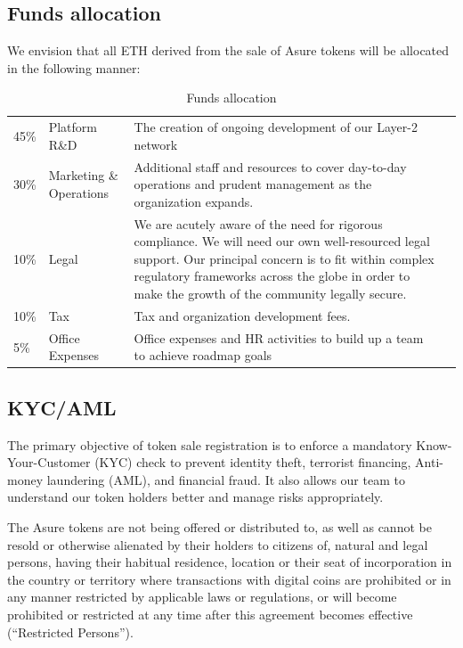 \subsection{Funds allocation}

We envision that all ETH derived from the sale of Asure tokens will be allocated in the following manner:
\newline\newline

\begin{table}[H]
\begin{tabular}{llp{}l}
  45\% & Platform R\&D & The creation of ongoing development of our Layer-2 network \\
  30\% & Marketing \& Operations & Additional staff and resources to cover day-to-day operations and prudent management as the organization expands. \\
  10\% & Legal & We are acutely aware of the need for rigorous compliance. We will need our own well-resourced legal support. Our principal concern is to fit within complex regulatory frameworks across the globe in order to make the growth of the community legally secure. \\
  10\% & Tax & Tax and organization development fees.\\
  5\% & Office Expenses & Office expenses and HR activities to build up
        a team to achieve roadmap goals
\end{tabular}
\caption{\label{tab:table-name}Funds allocation}
\end{table}

\subsection{KYC/AML}

The primary objective of token sale registration is to enforce a mandatory Know-Your-Customer (KYC) check to prevent identity theft, terrorist financing, Anti-money laundering (AML), and financial fraud. It also allows our team to understand our token holders better and manage risks appropriately.

The Asure tokens are not being offered or distributed to, as well as cannot be resold or otherwise alienated by their holders to citizens of, natural and legal persons, having their habitual residence, location or their seat of incorporation in the country or territory where transactions with digital coins are prohibited or in any manner restricted by applicable laws or regulations, or will become prohibited or restricted at any time after this agreement becomes effective (“Restricted Persons”).

